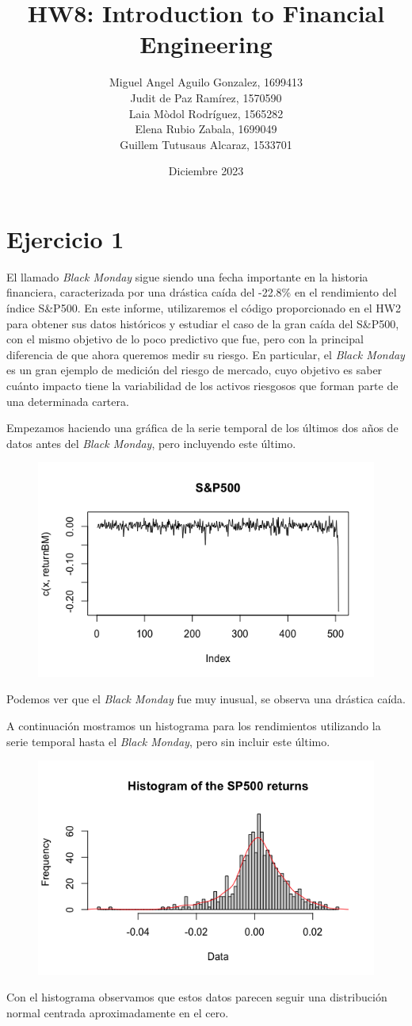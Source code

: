 \documentclass[a4paper]{article}
\title{\textbf{HW8: Introduction to Financial Engineering}}
\author{Miguel Angel Aguilo Gonzalez, 1699413 \\ Judit de Paz Ramírez, 1570590 \\ Laia Mòdol Rodríguez, 1565282 \\ Elena Rubio Zabala, 1699049 \\ Guillem Tutusaus Alcaraz, 1533701 }
\date{Diciembre 2023}
\begin{document}
\maketitle

\newpage

\section*{Ejercicio 1}
El llamado \textit{Black Monday} sigue siendo una fecha importante en la historia financiera, caracterizada por una drástica caída del -22.8\% en el rendimiento del índice S\&P500. En este informe, utilizaremos el código proporcionado en el HW2 para obtener sus datos históricos y estudiar el caso de la gran caída del S\&P500, con el mismo objetivo de lo poco predictivo que fue, pero con la principal diferencia de que ahora queremos medir su riesgo. En particular, el \textit{Black Monday} es un gran ejemplo de medición del riesgo de mercado, cuyo objetivo es saber cuánto impacto tiene la variabilidad de los activos riesgosos que forman parte de una determinada cartera.

Empezamos haciendo una gráfica de la serie temporal de los últimos dos años de datos antes del \textit{Black Monday}, pero incluyendo este último.
\begin{figure}[H]
    \centering
    \includegraphics[width=0.6\linewidth]{plot1.png}
\end{figure}
Podemos ver que el \textit{Black Monday} fue muy inusual, se observa una drástica caída.

A continuación mostramos un histograma para los rendimientos utilizando la serie temporal hasta el \textit{Black Monday}, pero sin incluir este último. 
\begin{figure}[H]
    \centering
    \includegraphics[width=0.6\linewidth]{plot2.png}
\end{figure}
Con el histograma observamos que estos datos parecen seguir una distribución normal centrada aproximadamente en el cero.
\end{document}
